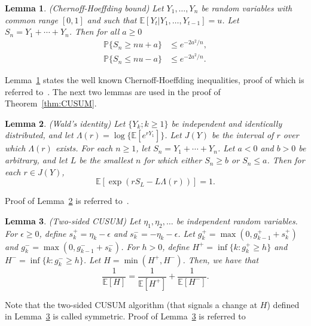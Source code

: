 \documentclass[letterpaper]{article} %
\newtheorem{lemma}{Lemma}
\begin{document}
\begin{lemma}\label{lem:Chernoff}
\emph{(Chernoff-Hoeffding bound)} Let $Y_1,\ldots,Y_n$ be random variables with common range $[0,1]$ and such that $\mathbb{E}[Y_t|Y_1,\ldots,Y_{t-1}]=u$. Let $S_n=Y_1+\cdots+Y_n$. Then for all $a\geq0$
\begin{align}
\mathbb{P}\{S_n\geq nu+a\}&\leq e^{-2a^2/n},\\
\mathbb{P}\{S_n\leq nu-a\}&\leq e^{-2a^2/n}.
\end{align}
\end{lemma}
Lemma~\ref{lem:Chernoff} states the well known Chernoff-Hoeffding inequalities, proof of which is referred to~\cite{pollard1984convergence}. The next two lemmas are used in the proof of Theorem~\ref{thm:CUSUM}.

\begin{lemma}\label{lem:Wald}
\emph{(Wald's identity)} Let $\{Y_k;k\geq 1\}$ be independent and identically distributed, and let $\Lambda(r)=\log\{\mathbb{E}[e^{rY_1}]\}$. Let $J(Y)$ be the interval of $r$ over which $\Lambda(r)$ exists. For each $n\geq1$, let $S_n=Y_1+\cdots+Y_n$. Let $a<0$ and $b>0$ be arbitrary, and let $L$ be the smallest $n$ for which either $S_n\geq b$ or $S_n\leq a$. Then for each $r\in J(Y)$,
\begin{equation}\label{eqn:Wald}
\mathbb{E}\left[\exp\left(rS_L-L\Lambda(r)\right)\right]=1.
\end{equation}
\end{lemma}
Proof of Lemma~\ref{lem:Wald} is referred to~\cite{gallager2012discrete}.

\begin{lemma}\label{lem:khan}
\emph{(Two-sided CUSUM)} Let $\eta_1,\eta_2,\ldots$ be independent random variables. For $\epsilon\geq0$, define $s_k^+=\eta_k-\epsilon$ and $s_k^-=-\eta_k-\epsilon$. Let $g^+_k=\max(0,g^+_{k-1}+s_k^+)$ and $g^-_k=\max(0,g^-_{k-1}+s_k^-)$. For $h>0$, define $H^+=\inf\{k:g_k^+\geq h\}$ and $H^-=\inf\{k:g_k^-\geq h\}$. Let $H=\min(H^+,H^-)$. Then, we have that
\begin{equation}
\frac{1}{\mathbb{E}[H]}=\frac{1}{\mathbb{E}[H^+]}+\frac{1}{\mathbb{E}[H^-]}.
\end{equation}
\end{lemma}
Note that the two-sided CUSUM algorithm (that signals a change at $H$) defined in Lemma~\ref{lem:khan} is called symmetric. Proof of Lemma~\ref{lem:khan} is referred to~\cite{khan1981note}
\end{document}
